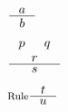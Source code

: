 \documentclass{article}
\begin{document}
$\inference{a}{b}$

$\inference{p & q \\ r}{s}$

$\inference[Rule]{t}{u}$
\end{document}
